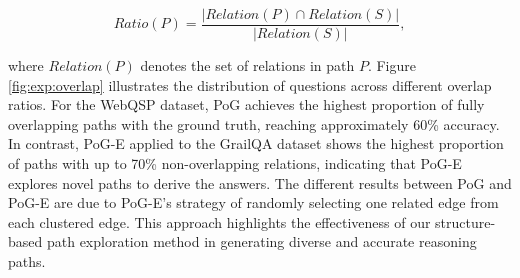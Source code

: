 \[
Ratio(P) = \frac{|Relation(P) \cap Relation(S)|}{|Relation(S)|},
\]

\noindent where $Relation(P)$ denotes the set of relations in path $P$.
Figure \ref{fig:exp:overlap} illustrates the distribution of questions across different overlap ratios. For the WebQSP dataset, PoG achieves the highest proportion of fully overlapping paths with the ground truth, reaching approximately 60\% accuracy. In contrast, PoG-E applied to the GrailQA dataset shows the highest proportion of paths with up to 70\% non-overlapping relations, indicating that PoG-E explores novel paths to derive the answers.
The different results between PoG and PoG-E are due to PoG-E's strategy of randomly selecting one related edge from each clustered edge. This approach highlights the effectiveness of our structure-based path exploration method in generating diverse and accurate reasoning paths.


